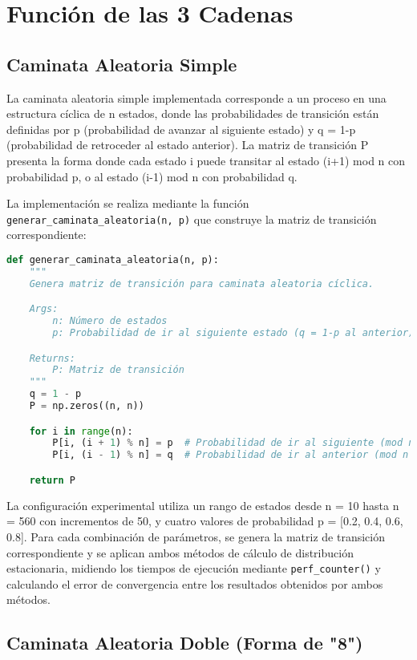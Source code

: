 \section{Función de las 3 Cadenas}

\subsection{Caminata Aleatoria Simple}

La caminata aleatoria simple implementada corresponde a un proceso en una estructura cíclica de n estados, donde las probabilidades de transición están definidas por p (probabilidad de avanzar al siguiente estado) y q = 1-p (probabilidad de retroceder al estado anterior). La matriz de transición P presenta la forma donde cada estado i puede transitar al estado (i+1) mod n con probabilidad p, o al estado (i-1) mod n con probabilidad q.

La implementación se realiza mediante la función \texttt{generar\_caminata\_aleatoria(n, p)} que construye la matriz de transición correspondiente:

\begin{lstlisting}[language=Python]
def generar_caminata_aleatoria(n, p):
    """
    Genera matriz de transición para caminata aleatoria cíclica.

    Args:
        n: Número de estados
        p: Probabilidad de ir al siguiente estado (q = 1-p al anterior)

    Returns:
        P: Matriz de transición
    """
    q = 1 - p
    P = np.zeros((n, n))

    for i in range(n):
        P[i, (i + 1) % n] = p  # Probabilidad de ir al siguiente (mod n para ciclo)
        P[i, (i - 1) % n] = q  # Probabilidad de ir al anterior (mod n para ciclo)

    return P
\end{lstlisting}

La configuración experimental utiliza un rango de estados desde n = 10 hasta n = 560 con incrementos de 50, y cuatro valores de probabilidad p = [0.2, 0.4, 0.6, 0.8]. Para cada combinación de parámetros, se genera la matriz de transición correspondiente y se aplican ambos métodos de cálculo de distribución estacionaria, midiendo los tiempos de ejecución mediante \texttt{perf\_counter()} y calculando el error de convergencia entre los resultados obtenidos por ambos métodos.

\subsection{Caminata Aleatoria Doble (Forma de "8")}

